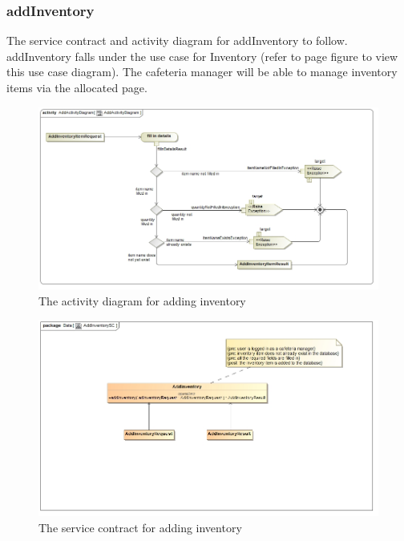 \documentclass[a4paper,12pt]{article}
\begin{document}
\subsubsection{addInventory}
The service contract and activity diagram for addInventory to follow. addInventory falls under the use case for Inventory (refer to page   figure   to view this use case diagram). The cafeteria manager will be able to manage inventory items via the allocated page.
\begin{figure}[H]
  \centering
    \includegraphics[width=1.0\textwidth]{../images/AddActivityDiagram.jpg}
    \caption{The activity diagram for adding inventory} 
\end{figure}

\begin{figure}[H]
	\centering
	\includegraphics[width=1.0\textwidth]{../images/AddInventorySC.jpg}
	\caption{The service contract for adding inventory}
\end{figure}
\end{document}
